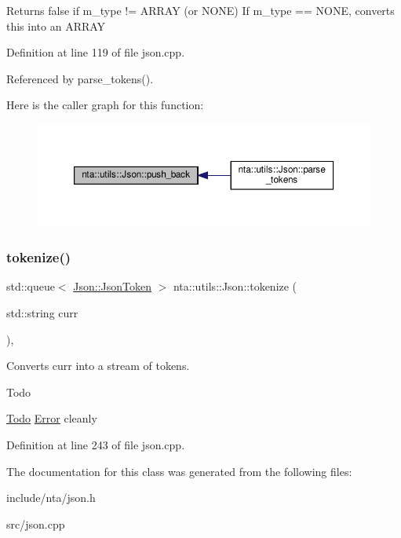 Returns false if m\+\_\+type != A\+R\+R\+AY (or N\+O\+NE) If m\+\_\+type == N\+O\+NE, converts this into an A\+R\+R\+AY 

Definition at line 119 of file json.\+cpp.



Referenced by parse\+\_\+tokens().

Here is the caller graph for this function\+:\nopagebreak
\begin{figure}[H]
\begin{center}
\leavevmode
\includegraphics[width=350pt]{d1/d3d/classnta_1_1utils_1_1Json_a2015e471fd47c1a077ca752c9b1fabbd_icgraph}
\end{center}
\end{figure}
\mbox{\label{classnta_1_1utils_1_1Json_a905d67b125a7aadd771bb74a1bb63f34}} 
\subsubsection{\texorpdfstring{tokenize()}{tokenize()}}
{\footnotesize\ttfamily std\+::queue$<$ \hyperlink{structnta_1_1utils_1_1Json_1_1JsonToken}{Json\+::\+Json\+Token} $>$ nta\+::utils\+::\+Json\+::tokenize (\begin{DoxyParamCaption}\item[{std\+::string}]{curr }\end{DoxyParamCaption})\hspace{0.3cm}{\ttfamily [static]}, {\ttfamily [private]}}



Converts curr into a stream of tokens. 

\begin{DoxyRefDesc}{Todo}
\item[\hyperlink{todo__todo000024}{Todo}]\hyperlink{structnta_1_1Error}{Error} cleanly \end{DoxyRefDesc}


Definition at line 243 of file json.\+cpp.



The documentation for this class was generated from the following files\+:\begin{DoxyCompactItemize}
\item 
include/nta/json.\+h\item 
src/json.\+cpp\end{DoxyCompactItemize}
